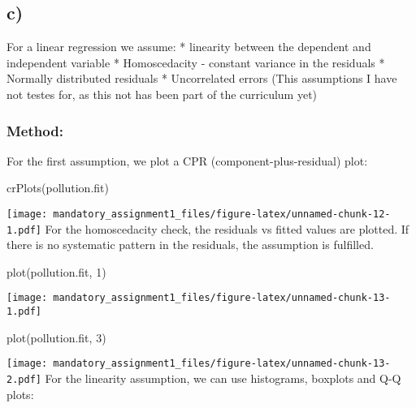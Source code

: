 \documentclass[
]{article}
\newenvironment{Shaded}{\begin{snugshade}}{\end{snugshade}}
\newcommand{\AttributeTok}[1]{\textcolor[rgb]{0.77,0.63,0.00}{#1}}
\newcommand{\DecValTok}[1]{\textcolor[rgb]{0.00,0.00,0.81}{#1}}
\newcommand{\FunctionTok}[1]{\textcolor[rgb]{0.00,0.00,0.00}{#1}}
\newcommand{\NormalTok}[1]{#1}
\newcommand{\SpecialCharTok}[1]{\textcolor[rgb]{0.00,0.00,0.00}{#1}}
\newcommand{\StringTok}[1]{\textcolor[rgb]{0.31,0.60,0.02}{#1}}
\begin{document}
\hypertarget{c}{%
\subsection{c)}\label{c}}

For a linear regression we assume: * linearity between the dependent and
independent variable * Homoscedacity - constant variance in the
residuals * Normally distributed residuals * Uncorrelated errors (This
assumptions I have not testes for, as this not has been part of the
curriculum yet)

\hypertarget{method-2}{%
\subsubsection{Method:}\label{method-2}}

For the first assumption, we plot a CPR (component-plus-residual) plot:

\begin{Shaded}
\begin{Highlighting}[]
\FunctionTok{crPlots}\NormalTok{(pollution.fit)}
\end{Highlighting}
\end{Shaded}

\texttt{[image: mandatory\_assignment1\_files/figure-latex/unnamed-chunk-12-1.pdf]}
For the homoscedacity check, the residuals vs fitted values are plotted.
If there is no systematic pattern in the residuals, the assumption is
fulfilled.

\begin{Shaded}
\begin{Highlighting}[]
\FunctionTok{plot}\NormalTok{(pollution.fit, }\DecValTok{1}\NormalTok{)}
\end{Highlighting}
\end{Shaded}

\texttt{[image: mandatory\_assignment1\_files/figure-latex/unnamed-chunk-13-1.pdf]}

\begin{Shaded}
\begin{Highlighting}[]
\FunctionTok{plot}\NormalTok{(pollution.fit, }\DecValTok{3}\NormalTok{)}
\end{Highlighting}
\end{Shaded}

\texttt{[image: mandatory\_assignment1\_files/figure-latex/unnamed-chunk-13-2.pdf]}
For the linearity assumption, we can use histograms, boxplots and Q-Q
plots:

\begin{Shaded}
\end{Shaded}
\end{document}
